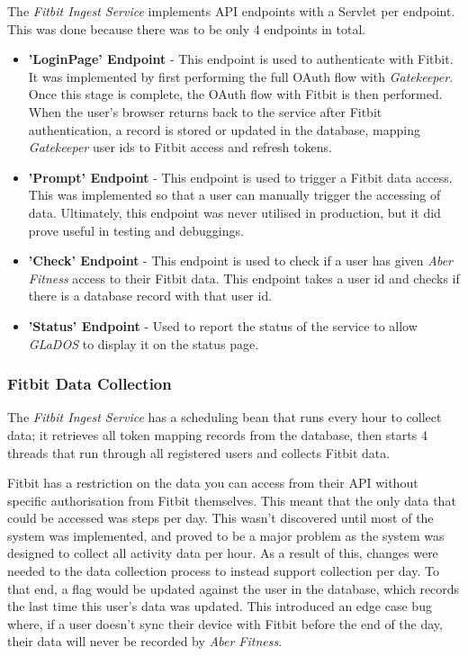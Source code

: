 The \textit{Fitbit Ingest Service} implements API endpoints with a Servlet per endpoint. This was done because there was to be only 4 endpoints in total.

\begin{itemize}
	\item \textbf{'LoginPage' Endpoint} - This endpoint is used to authenticate with Fitbit. It was implemented by first performing the full OAuth flow with \textit{Gatekeeper}. Once this stage is complete, the OAuth flow with Fitbit is then performed. When the user's browser returns back to the service after Fitbit authentication, a record is stored or updated in the database, mapping
	\textit{Gatekeeper} user ids to Fitbit access and refresh tokens.

	\item \textbf{'Prompt' Endpoint} - This endpoint is used to trigger a Fitbit data access. This was implemented so that a user can manually trigger the accessing of data. Ultimately, this endpoint was never utilised in production, but it did prove useful in testing and debuggings.

	\item \textbf{'Check' Endpoint} - This endpoint is used to check if a user has given \textit{Aber Fitness} access to their Fitbit data. This endpoint takes a user id and checks if there is a database record with that user id.

    \item \textbf{'Status' Endpoint} - Used to report the status of the service to allow \textit{GLaDOS} to display it on the status page.
\end{itemize}

\subsubsection{Fitbit Data Collection}

The \textit{Fitbit Ingest Service} has a scheduling bean that runs every hour to collect data; it retrieves all token mapping records from the database, then starts 4 threads that run through all registered users and collects Fitbit data.

Fitbit has a restriction on the data you can access from their API without specific authorisation from Fitbit themselves. This meant that the only data that could be accessed was steps per day. This wasn't discovered until most of the system was implemented, and proved to be a major problem as the system was designed to collect all activity data per hour. As a result of this, changes were needed to the data collection process to instead support collection per day. To that end, a flag would be updated against the user in the database, which records the last time this user's data was updated. This introduced an edge case bug where, if a user doesn't sync their device with Fitbit before the end of the day, their data will never be recorded by \textit{Aber Fitness}.

